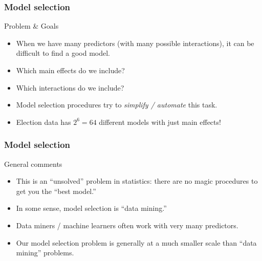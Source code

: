 \documentclass[handout]{beamer}
\begin{document}

   \begin{frame} \frametitle{Model selection}

   \begin{block}
   {Problem \& Goals}
   \begin{itemize}
   \item When we have many predictors (with many possible interactions), it can be difficult to find a good model.
   \item Which main effects do we include?
   \item Which interactions do we include?

   \item Model selection procedures try to {\em simplify / automate} this task.

   \item Election data has  $2^6=64$ different models with just main effects!
   \end{itemize}
   \end{block}
   \end{frame}


   \begin{frame} \frametitle{Model selection}

   \begin{block}
   {General comments}
   \begin{itemize}

   \item This is an ``unsolved'' problem in statistics: there are no magic procedures to get you the ``best model.''
   \item In some sense, model selection is ``data mining.''

   \item Data miners / machine learners often work with very many predictors.

   \item Our model selection problem is generally at a much smaller scale than ``data mining'' problems.

   \end{itemize}
   \end{block}
   \end{frame}

\end{document}
